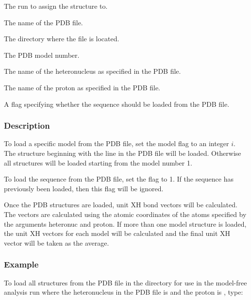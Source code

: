   The run to assign the structure to.

  The name of the PDB file.

  The directory where the file is located.

  The PDB model number.

  The name of the heteronucleus as specified in the PDB file.

  The name of the proton as specified in the PDB file.

  A flag specifying whether the sequence should be loaded from the PDB file.

\subsubsection{Description}

To load a specific model from the PDB file, set the model flag to an integer $i$.  The
structure beginning with the line 
 in the PDB file will be loaded.  Otherwise all
structures will be loaded starting from the model number 1.

To load the sequence from the PDB file, set the 
 flag to 1.  If the sequence has
previously been loaded, then this flag will be ignored.

Once the PDB structures are loaded, unit XH bond vectors will be calculated.  The vectors
are calculated using the atomic coordinates of the atoms specified by the arguments
heteronuc and proton.  If more than one model structure is loaded, the unit XH vectors for
each model will be calculated and the final unit XH vector will be taken as the average.


\subsubsection{Example}

To load all structures from the PDB file 
 in the directory 
 for use in the
model-free analysis run 
 where the heteronucleus in the PDB file is 
 and the proton
is 
, type:





